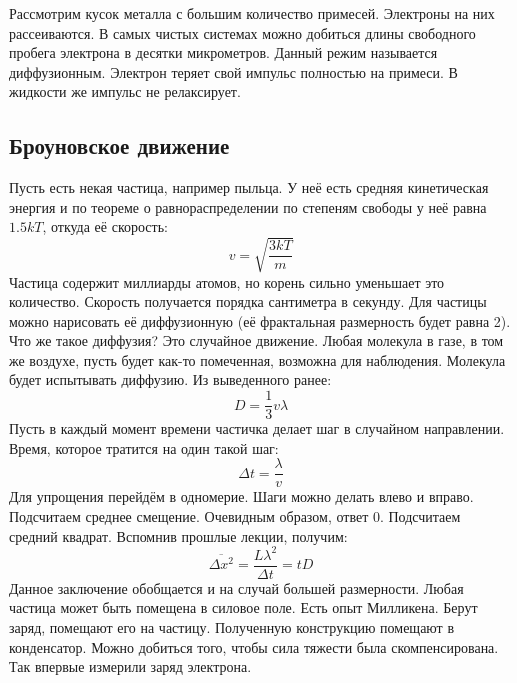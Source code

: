 \documentclass[a4paper, 12pt]{article}
\begin{document}
	Рассмотрим кусок металла с большим количество примесей. Электроны на них рассеиваются. В самых чистых системах можно добиться длины свободного пробега электрона в десятки микрометров. Данный режим называется диффузионным. Электрон теряет свой импульс полностью на примеси. В жидкости же импульс не релаксирует.
	
	\subsection{Броуновское движение}
	Пусть есть некая частица, например пыльца. У неё есть средняя кинетическая энергия и по теореме о равнораспределении по степеням свободы у неё равна $1.5 kT$, откуда её скорость:
	\begin{equation*}
		v = \sqrt{\frac{3kT}{m}}
	\end{equation*}
	Частица содержит миллиарды атомов, но корень сильно уменьшает это количество. Скорость получается порядка сантиметра в секунду. Для частицы можно нарисовать её диффузионную (её фрактальная размерность будет равна 2). Что же такое диффузия? Это случайное движение. Любая молекула в газе, в том же воздухе, пусть будет как-то помеченная, возможна для наблюдения. Молекула будет испытывать диффузию. Из выведенного ранее:
	\begin{equation*}
		D = \frac{1}{3} v \lambda
	\end{equation*}
	Пусть в каждый момент времени частичка делает шаг в случайном направлении. Время, которое тратится на один такой шаг:
	\begin{equation*}
		\Delta t = \frac{\lambda}{v}
	\end{equation*}
	Для упрощения перейдём в одномерие. Шаги можно делать влево и вправо. Подсчитаем среднее смещение. Очевидным образом, ответ 0. Подсчитаем средний квадрат. Вспомнив прошлые лекции, получим:
	\begin{equation*}
		\overline{\Delta x^{2}} = \frac{L \lambda^{2}}{\Delta t} = tD
	\end{equation*}
	Данное заключение обобщается и на случай большей размерности. Любая частица может быть помещена в силовое поле. Есть опыт Милликена. Берут заряд, помещают его на частицу. Полученную конструкцию помещают в конденсатор. Можно добиться того, чтобы сила тяжести была скомпенсирована. Так впервые измерили заряд электрона.
\end{document}
